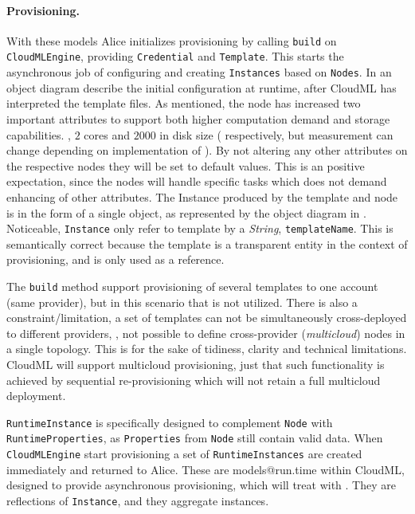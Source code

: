 \paragraph{Provisioning.}


With these models Alice initializes provisioning by calling 
\texttt{build} on \texttt{CloudMLEngine}, providing \texttt{Credential} and \texttt{Template}.
This starts the asynchronous job of configuring and creating 
\texttt{Instances} based on \texttt{Nodes}.
In  an object diagram describe the initial configuration at runtime,
after CloudML has interpreted the template files.
As mentioned, the node has increased two important attributes to support both higher computation 
demand and storage capabilities. \ie, $2$ cores and $2000$ in disk size 
( respectively, but measurement can change depending on implementation of ).
By not altering any other attributes on the respective nodes they will be set to default values.
This is an positive expectation, since the nodes will handle specific tasks which does not 
demand enhancing of other attributes.
The Instance produced by the template and node is in the form of a single object,
as represented by the object diagram in .
Noticeable, \texttt{Instance} only refer to template by a \emph{String}, \texttt{templateName}.
This is semantically correct because the template is a transparent entity
in the context of provisioning, and is only used as a reference.

The \texttt{build} method support provisioning of several templates to one account (same provider),
but in this scenario that is not utilized.
There is also a constraint/limitation, a set of templates can not be simultaneously 
cross-deployed to different providers,
\ie, not possible to define cross-provider (\emph{multicloud}) nodes in a single topology.
This is for the sake of tidiness, clarity and technical limitations.
CloudML will support multicloud provisioning,
just that such functionality is achieved by sequential re-provisioning 
which will not retain a full multicloud deployment.

\texttt{RuntimeInstance} is specifically designed to complement \texttt{Node} with \texttt{RuntimeProperties},
as \texttt{Properties} from \texttt{Node} still contain valid data.
When \texttt{CloudMLEngine} start provisioning a set of \texttt{RuntimeInstances} are created immediately 
and returned to Alice.
These are models@run.time within CloudML, designed to provide asynchronous provisioning,
which will treat with .
They are reflections of \texttt{Instance}, and they aggregate instances.

